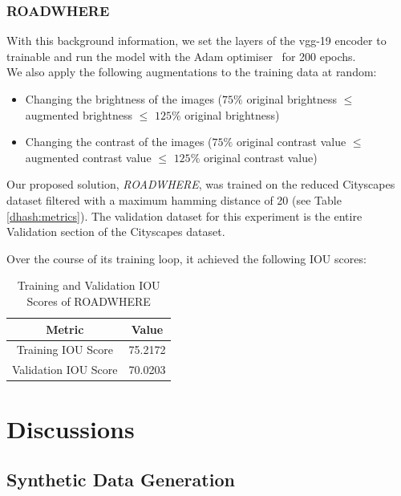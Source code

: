 \documentclass[letterpaper, 10 pt, conference]{ieeeconf}  %
\begin{document}
\subsubsection{ROADWHERE}
\label{encoder:roadwhere}

With this background information, we set the layers of the vgg-19 encoder to trainable and run the model with the Adam optimiser~\cite{kingma:adam} for 200 epochs. 
\\
We also apply the following augmentations to the training data at random:
\begin{itemize}
    \item Changing the brightness of the images ($75\%$ original brightness $\leq$ augmented brightness $\leq$ $125\%$ original brightness)
    \item Changing the contrast of the images ($75\%$ original contrast value $\leq$ augmented contrast value $\leq$ $125\%$ original contrast value)
\end{itemize}

Our proposed solution, \textit{ROADWHERE}, was trained on the reduced Cityscapes dataset filtered with a maximum hamming distance of 20 (see Table \ref{dhash:metrics}). The validation dataset for this experiment is the entire Validation section of the Cityscapes dataset. 

Over the course of its training loop, it achieved the following IOU scores: 
\begin{table}[!h]
\vspace{-2mm}
\caption{Training and Validation IOU Scores of ROADWHERE}
\vspace{-4mm}
\label{roadwhere:metrics}
\begin{center}
\begin{tabular}{|c|c|}
\hline
\textbf{Metric} & \textbf{Value}  \\
\hline
Training IOU Score & 75.2172  \\
\hline
Validation IOU Score & 70.0203 \\
\hline
\end{tabular}
\end{center}
\vspace{-6mm}
\end{table}


\section{Discussions}
\label{discussions}

\subsection{Synthetic Data Generation}
\label{discussion:syndata}
\end{document}
